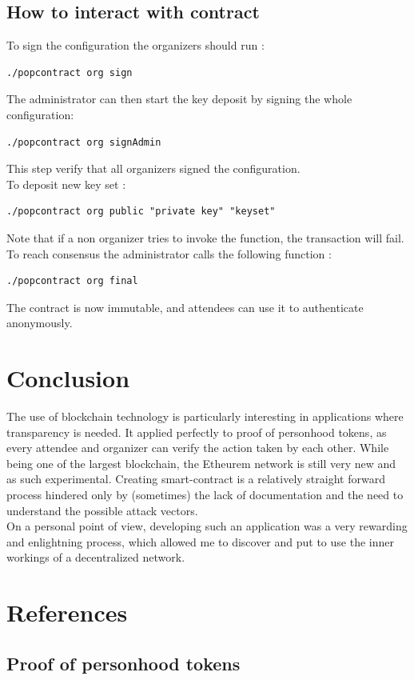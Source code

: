 \documentclass[11pt, a4paper, twoside, openright]{article} %
\begin{document}
\subsection{How to interact with contract}
To sign the configuration the organizers should run :
\begin{verbatim}
./popcontract org sign
\end{verbatim}
The administrator can then start the key deposit by signing the whole configuration:
\begin{verbatim}
./popcontract org signAdmin
\end{verbatim}
This step verify that all organizers signed the configuration. \\
To deposit new key set :
\begin{verbatim}
./popcontract org public "private key" "keyset"
\end{verbatim}
Note that if a non organizer tries to invoke the function, the transaction will fail.
To reach consensus the administrator calls the following function :
\begin{verbatim}
./popcontract org final
\end{verbatim}
The contract is now immutable, and attendees can use it to authenticate anonymously.
\section{Conclusion}
The use of blockchain technology is particularly interesting in applications where transparency is needed. It applied perfectly to proof of
personhood tokens, as every attendee and organizer can verify the action taken by each other. While being one of the largest blockchain, the Etheurem network is still very new and as such experimental. Creating smart-contract is a relatively straight forward process hindered only by
(sometimes) the lack of documentation and the need to understand the possible attack vectors.\\
On a personal point of view, developing such an application was a very rewarding and enlightning process, which allowed me to discover and put to use the inner workings
of a decentralized network.
\newpage

\section*{References}
\subsection*{Proof of personhood tokens}
\end{document}
